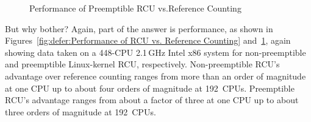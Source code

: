 \begin{figure}[tb]
\centering
{}
\caption{Performance of Preemptible RCU vs.\@ Reference Counting}
\label{fig:defer:Performance of Preemptible RCU vs. Reference Counting}
\end{figure}

But why bother?
Again, part of the answer is performance, as shown in
Figures~\ref{fig:defer:Performance of RCU vs. Reference Counting}
and~\ref{fig:defer:Performance of Preemptible RCU vs. Reference Counting},
again showing data taken on a 448-CPU 2.1\,GHz Intel x86 system
for non-preemptible and preemptible Linux-kernel RCU, respectively.
Non-preemptible RCU's advantage over reference counting ranges from
more than an order of magnitude at one CPU up to about four orders of
magnitude at 192~CPUs.
Preemptible RCU's advantage ranges from about a factor of three at
one CPU up to about three orders of magnitude at 192~CPUs.

